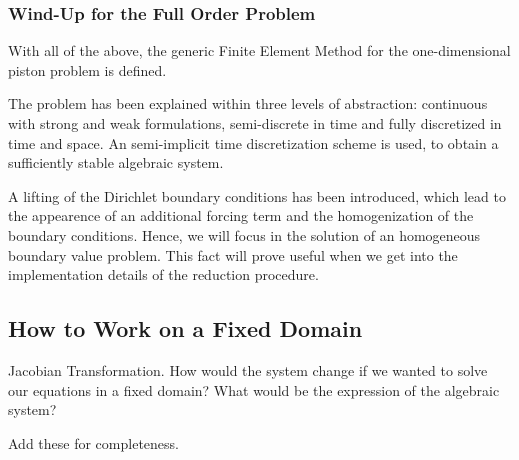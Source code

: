 \documentclass[../../thesis.tex]{subfiles}
\begin{document}
\subsubsection{Wind-Up for the Full Order Problem}
With all of the above, the generic Finite Element Method for the one-dimensional piston problem is defined.

The problem has been explained within three levels of abstraction: 
continuous with strong and weak formulations, semi-discrete in time 
and fully discretized in time and space.
An semi-implicit time discretization scheme is used, to obtain a sufficiently stable algebraic system.


A lifting of the Dirichlet boundary conditions has been introduced, 
which lead to the appearence of an additional forcing term and 
the homogenization of the boundary conditions.
Hence, we will focus in the solution of an homogeneous boundary value problem.
This fact will prove useful when we get into 
the implementation details of the reduction procedure.

\subsection{How to Work on a Fixed Domain}

Jacobian Transformation.
How would the system change if we wanted to 
solve our equations in a fixed domain?
What would be the expression of the algebraic system?

Add these for completeness.
\end{document}
